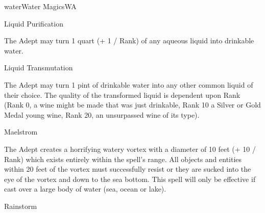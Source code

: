 \begin{college}[1.3]{water}{Water Magics}{WA}
\begin{spell}[S-5]{Liquid Purification}

\begin{effects}
The Adept may turn 1 quart (+ 1 / Rank) of any aqueous liquid into
drinkable water.
\end{effects}
\end{spell}

\begin{spell}[S-6]{Liquid Transmutation}

\begin{effects}
The Adept may turn 1 pint of drinkable water into any other common
liquid of their choice. The quality of the transformed liquid is
dependent upon Rank (Rank 0, a wine might be made that was just
drinkable, Rank 10 a Silver or Gold Medal young wine, Rank 20, an
unsurpassed wine of its type).
\end{effects}
\end{spell}

\begin{spell}[S-7]{Maelstrom}

\begin{effects}
The Adept creates a horrifying watery vortex with a diameter of 10
feet (+ 10 / Rank) which exists entirely within the spell's range. All
objects and entities within 20 feet of the vortex must successfully
resist or they are sucked into the eye of the vortex and down to the
sea bottom. This spell will only be effective if cast over a large
body of water (sea, ocean or lake).
\end{effects}
\end{spell}

\begin{spell}[S-8]{Rainstorm}


\end{spell}
\end{college}
